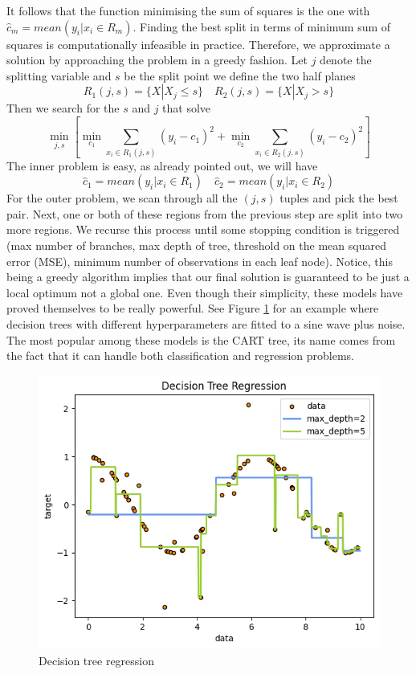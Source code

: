 It follows that the function minimising the sum of squares is the one with $\hat{c}_m=mean(y_i|x_i \in R_m)$.
Finding the best split in terms of minimum sum of squares is computationally infeasible in practice. Therefore, we approximate a solution by approaching the problem in a greedy fashion.
Let $j$ denote the splitting variable and $s$ be the split point we define the two half planes
\begin{equation}
    R_1(j,s)=\{X|X_j\leq s\} \quad R_2(j,s)=\{X|X_j >s\}
\end{equation}
Then we search for the $s$ and $j$ that solve
\begin{equation}
    \min_{j,s}\left[\min_{c_1} \sum\limits_{x_i \in R_1(j,s)}(y_i-c_1)^2+\min_{c_2} \sum\limits_{x_i \in R_2(j,s)}(y_i-c_2)^2\right]
\end{equation}
The inner problem is easy, as already pointed out, we will have 
\begin{equation}
    \hat{c}_1=mean(y_i|x_i \in R_1) \quad \hat{c}_2=mean(y_i|x_i \in R_2)
\end{equation}
For the outer problem, we scan through all the $(j,s)$ tuples and pick the best pair. 
Next, one or both of these regions from the previous step are split into two more regions. We recurse this process until some stopping condition is triggered (max number of branches, max depth of tree, threshold on the mean squared error (MSE), minimum number of observations in each leaf node).
Notice, this being a greedy algorithm implies that our final solution is guaranteed to be just a local optimum not a global one.
Even though their simplicity, these models have proved themselves to be really powerful. See Figure \ref{fig:decision_tree} for an example where decision trees with different hyperparameters are fitted to a sine wave plus noise. The most popular among these models is the CART \cite{breiman2017classification} tree, its name comes from the fact that it can handle both classification and regression problems.
\begin{figure}
    \includegraphics[width=\textwidth]{images/decision_tree.png}
    \caption{Decision tree regression}
    \label{fig:decision_tree}
\end{figure}
    
